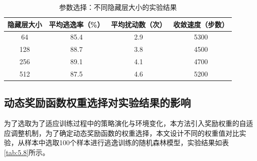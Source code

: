 


\begin{table}[htbp]
	\centering
	\caption{参数选择：不同隐藏层大小的实验结果}
	\label{tab:5.7}
	\begin{tabular*}{0.9\textwidth}{@{\extracolsep{\fill}}cccc}
		\toprule
		隐藏层大小 & 平均逃逸率（\%） & 平均扰动数（次） & 收敛速度（步数） \\
		\midrule
		64  & 85.4 & 2.9 & 5300 \\
		128 & 88.7 & 3.8 & 4500 \\
		256 & 89.1 & 4.1 & 4700 \\
		512 & 87.5 & 4.6 & 5200 \\
		\bottomrule
	\end{tabular*}
\end{table}

\subsection{动态奖励函数权重选择对实验结果的影响}

为了选取为了适应训练过程中的策略演化与环境变化，本方法引入奖励权重的自适应调整机制，为了确定动态奖励函数的权重选择，本文设计不同的权重值对比实验，从样本中选取100个样本进行逃逸训练的随机森林模型，实验结果如表\ref{tab:5.8}所示。



